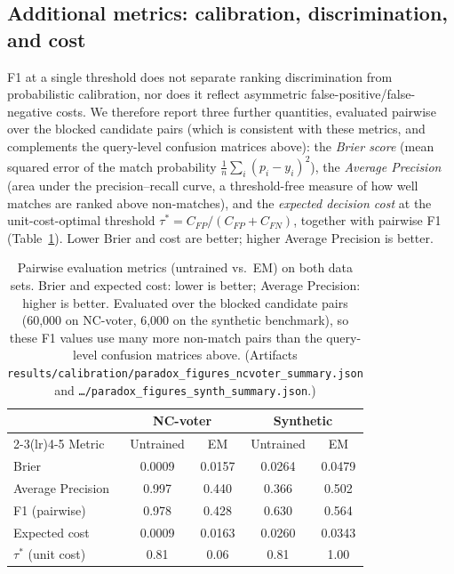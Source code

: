\documentclass[11pt]{article}
\begin{document}
\subsection{Additional metrics: calibration, discrimination, and cost}
\label{sec:metrics}
F1 at a single threshold does not separate ranking discrimination from probabilistic
calibration, nor does it reflect asymmetric false-positive/false-negative costs. We therefore
report three further quantities, evaluated pairwise over the blocked candidate pairs (which
is consistent with these metrics, and complements the query-level confusion matrices above):
the \emph{Brier score} \cite{brier} (mean squared error of the match probability
$\frac1n\sum_i(p_i-y_i)^2$), the \emph{Average Precision} (area under the precision--recall
curve, a threshold-free measure of how well matches are ranked above non-matches), and the
\emph{expected decision cost} at the unit-cost-optimal threshold
$\tau^*=C_{FP}/(C_{FP}+C_{FN})$, together with pairwise F1 (Table~\ref{tab:metrics}).
Lower Brier and cost are better; higher Average Precision is better.

\begin{table}[h]
\centering
\caption{Pairwise evaluation metrics (untrained vs.\ EM) on both data sets. Brier and
expected cost: lower is better; Average Precision: higher is better. Evaluated over the
blocked candidate pairs (60{,}000 on NC-voter, 6{,}000 on the synthetic benchmark), so these
F1 values use many more non-match pairs than the query-level confusion matrices above.
(Artifacts \texttt{results/calibration/paradox\_figures\_ncvoter\_summary.json} and
\texttt{\ldots/paradox\_figures\_synth\_summary.json}.)}
\label{tab:metrics}
\begin{tabular}{lcccc}
\toprule
 & \multicolumn{2}{c}{NC-voter} & \multicolumn{2}{c}{Synthetic} \\
\cmidrule(lr){2-3}\cmidrule(lr){4-5}
Metric & Untrained & EM & Untrained & EM \\
\midrule
Brier & 0.0009 & 0.0157 & 0.0264 & 0.0479 \\
Average Precision & 0.997 & 0.440 & 0.366 & 0.502 \\
F1 (pairwise) & 0.978 & 0.428 & 0.630 & 0.564 \\
Expected cost & 0.0009 & 0.0163 & 0.0260 & 0.0343 \\
$\tau^*$ (unit cost) & 0.81 & 0.06 & 0.81 & 1.00 \\
\bottomrule
\end{tabular}
\end{table}
\end{document}
